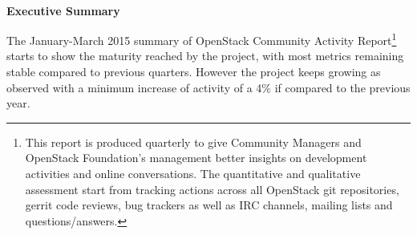 \documentclass[a4wide,11pt]{report}
\begin{document}
~~\\
~~\\
~~\\
~~\\
~~\\
~~\\







\newpage

\begin{center}
\textbf{Executive Summary}
\end{center}

The January-March 2015 summary of OpenStack Community Activity
Report\footnote{This report is produced quarterly to give Community
Managers and OpenStack Foundation's management better insights on
development activities and online conversations. The quantitative and
qualitative assessment start from tracking actions across all
OpenStack git repositories, gerrit code reviews, bug trackers as well
as IRC channels, mailing lists and questions/answers.} starts to show
the maturity reached by the project, with most metrics remaining
stable compared to previous quarters. However the project keeps growing
as observed with a minimum increase of activity of a 4\% if compared to 
the previous year.
\end{document}
